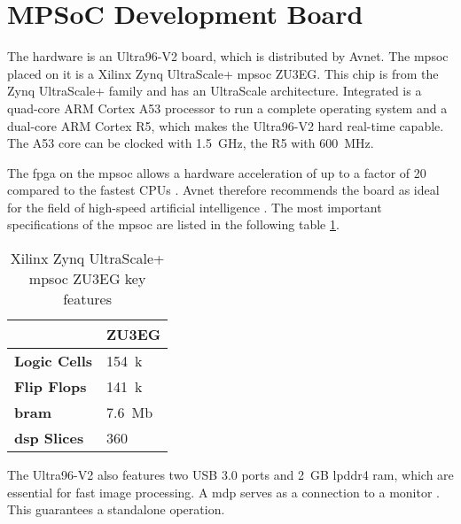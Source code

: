 \section{MPSoC Development Board}
\label{sec:hardware:mpsoc_development_board}

The hardware is an Ultra96-V2 board, which is distributed by Avnet.
The \acrfull{mpsoc} placed on it is a Xilinx Zynq UltraScale+ \acrshort{mpsoc} ZU3EG.
This chip is from the Zynq UltraScale+ family and has an UltraScale architecture.
Integrated is a quad-core ARM Cortex A53 processor to run a complete operating system and a dual-core ARM Cortex R5, which makes the Ultra96-V2 hard real-time capable.
The A53 core can be clocked with \SI{1.5}{GHz}, the R5 with \SI{600}{MHz}.

The \acrshort{fpga} on the \acrshort{mpsoc} allows a hardware acceleration of up to a factor of 20 compared to the fastest CPUs \cite{acceleration_xilinx}.
Avnet therefore recommends the board as ideal for the field of high-speed artificial intelligence \cite{ai_resources_xilinx}.
The most important specifications of the \acrshort{mpsoc} are listed in the following table \ref{tab:specs_MPSoC}.

\begin{table}[h]
	\caption{Xilinx Zynq UltraScale+ \acrshort{mpsoc} ZU3EG key features \cite{xilinx_zynq}}
	\label{tab:specs_MPSoC}
	\centering
	\begin{tabular}{ll}
		\toprule
		& \textbf{ZU3EG} \\
		\midrule
		\textbf{Logic Cells} & \SI{154}{k} \\
		\textbf{Flip Flops} & \SI{141}{k} \\
		\textbf{\acrshort{bram}} & \SI{7.6}{Mb} \\
		\textbf{\acrshort{dsp} Slices} & 360 \\
		\bottomrule
	\end{tabular}
\end{table}

The Ultra96-V2 also features two USB 3.0 ports and \SI{2}{GB} \acrfull{lpddr4} \acrshort{ram}, which are essential for fast image processing.
A \acrfull{mdp} serves as a connection to a monitor \cite{avnet_ultra96v2}.
This guarantees a standalone operation.

